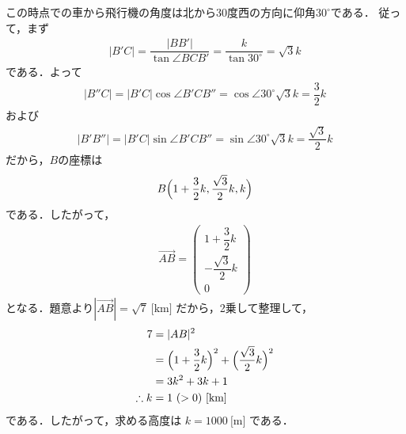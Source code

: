 \documentclass[../../main.tex]{subfiles}
\begin{document}
この時点での車から飛行機の角度は北から30度西の方向に仰角$30^{\circ}$である．
従って，まず
\begin{align}
  |B'C| = \dfrac{|BB'|}{\tan \angle BCB'} = \dfrac{k}{\tan 30^{\circ}} = \sqrt{3}k \label{eq:1}
\end{align}
である．よって
\begin{align}
  |B''C| = |B'C|\cos\angle B'CB'' = \cos\angle 30^{\circ} \sqrt{3}k = \dfrac{3}{2}k
\end{align}
および
\begin{align}
  |B'B''| = |B'C|\sin\angle B'CB'' = \sin\angle 30^{\circ} \sqrt{3}k = \dfrac{\sqrt{3}}{2}k
\end{align}
だから，$B$の座標は
\begin{align}
  B\Bigl( 1 + \dfrac{3}{2}k, \dfrac{\sqrt{3}}{2}k, k \Bigr)
\end{align}
である．したがって，
\begin{align}
  \overrightarrow{AB} =
  \begin{pmatrix} 1 + \dfrac{3}{2}k \\ -\dfrac{\sqrt{3}}{2}k \\ 0
  \end{pmatrix}
\end{align}
となる．題意より$|\overrightarrow{AB}| = \sqrt{7}\ \text{[km]}$ だから，2乗して整理して，
\begin{align}
  7 &= |AB|^2 \\
  &= \Bigl(1 + \dfrac{3}{2}k\Bigr)^2 + \Bigl(\dfrac{\sqrt{3}}{2}k\Bigr)^2 \\
  &= 3k^2 + 3k + 1 \\
  \therefore
  k &= 1\ (>0)\ \text{[km]}
\end{align}
である．したがって，求める高度は $k = 1000\ \text{[m]}$ である．

\newpage
\end{document}
